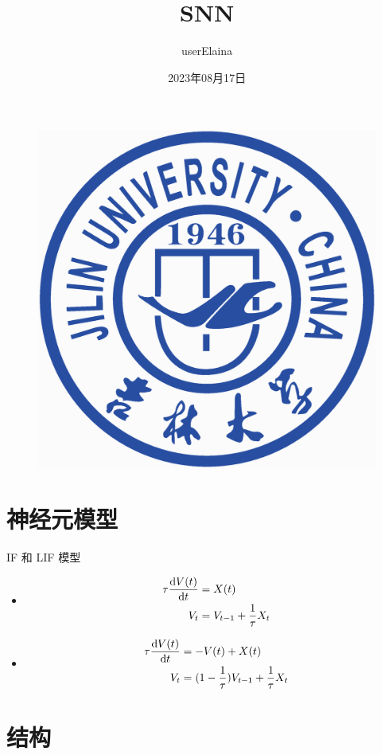 \documentclass{beamer}
\author{userElaina}
\title{SNN}
\subtitle{}
\institute{人工智能学院}
\date{2023年08月17日}
\begin{document}
\kaishu
\begin{frame}
    \titlepage
    \begin{figure}[htpb]
        \begin{center}
            \includegraphics[width=0.15\linewidth]{pic/Jilin_University_Logo.eps}
        \end{center}
    \end{figure}
\end{frame}

\begin{frame}
    \tableofcontents[sectionstyle=show,subsectionstyle=show/shaded/hide,subsubsectionstyle=show/shaded/hide]
\end{frame}


\section{神经元模型}

\begin{frame}{IF 和 LIF 模型}
    \begin{itemize}
        \item\begin{equation*}
            \begin{aligned}
                \tau\frac{{\rm d}V(t)}{{\rm d}t} &= X(t) \\
                V_t &= V_{t-1}+\frac{1}{\tau}X_t
            \end{aligned}
        \end{equation*}
        \item\begin{equation*}
            \begin{aligned}
                \tau\frac{{\rm d}V(t)}{{\rm d}t} &= -V(t)+X(t) \\
                V_t &= (1-\frac{1}{\tau})V_{t-1}+\frac{1}{\tau} X_t
            \end{aligned}
        \end{equation*}
    \end{itemize}
\end{frame}

\section{结构}
\end{document}
